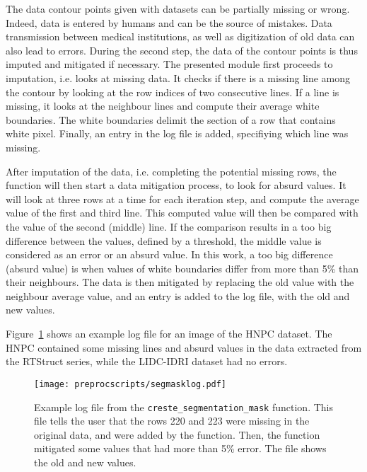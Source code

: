The data contour points given with datasets can be partially missing or wrong. Indeed, data is entered by humans and can be the source of mistakes. Data transmission between medical institutions, as well as digitization of old data can also lead to errors. During the second step, the data of the contour points is thus imputed and mitigated if necessary. The presented module first proceeds to imputation, i.e. looks at missing data. It checks if there is a missing line among the contour by looking at the row indices of two consecutive lines. If a line is missing, it looks at the neighbour lines and compute their average white boundaries. The white boundaries delimit the section of a row that contains white pixel. Finally, an entry in the log file is added, specifiying which line was missing.

After imputation of the data, i.e. completing the potential missing rows, the function will then start a data mitigation process, to look for absurd values. It will look at three rows at a time for each iteration step, and compute the average value of the first and third line. This computed value will then be compared with the value of the second (middle) line. If the comparison results in a too big difference between the values, defined by a threshold, the middle value is considered as an error or an absurd value. In this work, a too big difference (absurd value) is when values of white boundaries differ from more than 5\% than their neighbours. The data is then mitigated by replacing the old value with the neighbour average value, and an entry is added to the log file, with the old and new values.

Figure~\ref{fig:segmasklog} shows an example log file for an image of the HNPC dataset. The HNPC contained some missing lines and absurd values in the data extracted from the RTStruct series, while the LIDC-IDRI dataset had no errors.

\begin{figure}[t!]
  \centering
  \texttt{[image: preprocscripts/segmasklog.pdf]}
  \caption[Example log file from the \texttt{create\_segmentation\_mask} function]{Example log file from the \texttt{creste\_segmentation\_mask} function. This file tells the user that the rows 220 and 223 were missing in the original data, and were added by the function. Then, the function mitigated some values that had more than 5\% error. The file shows the old and new values.}
  \label{fig:segmasklog}
\end{figure}

